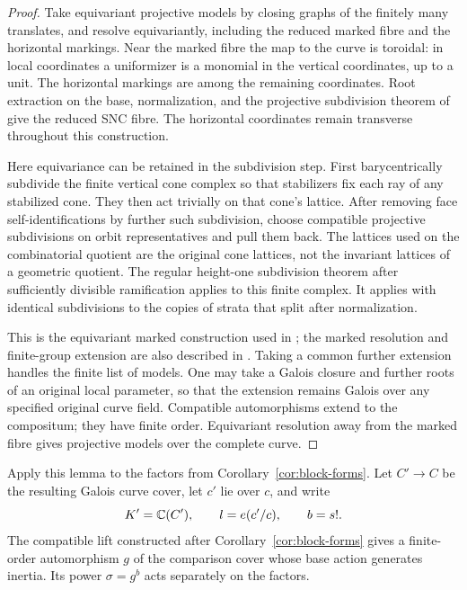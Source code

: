 \begin{proof}
Take equivariant projective models by closing graphs of the finitely
many translates, and resolve equivariantly, including the reduced
marked fibre and the horizontal markings. Near the marked fibre the
map to the curve is toroidal: in local coordinates a uniformizer is a
monomial in the vertical coordinates, up to a unit. The horizontal
markings are among the remaining coordinates. Root extraction on the
base, normalization, and the projective subdivision theorem of
\cite[Chapter~IV, Section~3]{KKMSD} give the reduced SNC fibre.
The horizontal coordinates remain transverse throughout this
construction.

Here equivariance can be retained in the subdivision step. First
barycentrically subdivide the finite vertical cone complex so that
stabilizers fix each ray of any stabilized cone. They then act trivially
on that cone's lattice. After removing face self-identifications by
further such subdivision, choose compatible projective subdivisions on
orbit representatives and pull them back. The lattices used on the
combinatorial quotient are the original cone lattices, not the
invariant lattices of a geometric quotient. The regular height-one
subdivision theorem after sufficiently divisible ramification applies
to this finite complex. It applies with identical subdivisions to the
copies of strata that split after normalization.

This is the equivariant marked construction used in
\cite[Section~4]{U}; the marked resolution and finite-group extension
are also described in \cite[Paragraphs~16 and~21]{KNX}.
Taking a common further extension handles the finite list of models.
One may take a Galois closure and further roots of an original local
parameter, so that the extension remains Galois over any specified
original curve field. Compatible automorphisms extend to the
compositum; they have finite order. Equivariant resolution away from
the marked fibre gives projective models over the complete curve.
\end{proof}

Apply this lemma to the factors from Corollary~\ref{cor:block-forms}.
Let $C'\to C$ be the resulting Galois curve cover, let $c'$ lie over $c$,
and write
\[
 K'=\mathbb C(C'),\qquad l=e(c'/c),\qquad b=s!.
\]
The compatible lift constructed after Corollary~\ref{cor:block-forms}
gives a finite-order automorphism $g$ of the comparison cover whose
base action generates inertia. Its power $\sigma=g^b$ acts separately
on the factors.


